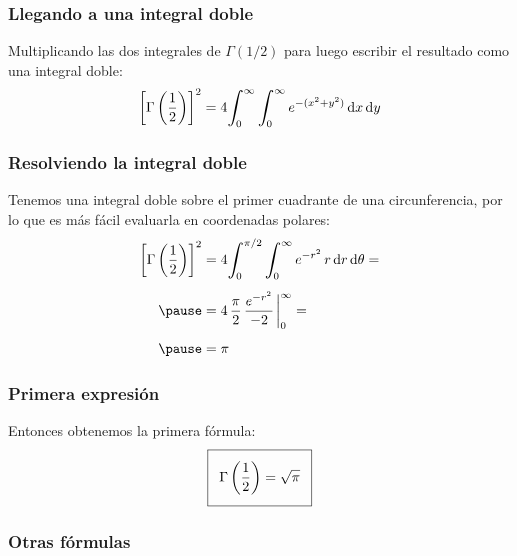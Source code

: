 \documentclass[12pt]{beamer}
\begin{document}
\begin{frame}
\frametitle{Llegando a una integral doble}
Multiplicando las dos integrales de $\Gamma (1/2)$ para luego escribir el resultado como una integral doble:
\pause
\begin{align*}
\left[ \Gamma \left( \dfrac{1}{2} \right) \right]^{2} = 4 \scaleint{6ex}_{\bs 0}^{\infty} \, \scaleint{6ex}_{\bs 0}^{\infty} \, e^{-(x^{2} + y^{2})} \dd{x} \dd{y}
\end{align*}
\end{frame}
\begin{frame}
\frametitle{Resolviendo la integral doble}
Tenemos una integral doble sobre el primer cuadrante de una circunferencia, por lo que es más fácil evaluarla en coordenadas polares:
\pause
\begin{eqnarray*}
\begin{aligned}
\left[ \Gamma \left( \dfrac{1}{2} \right) \right]^{2} &= 4 \scaleint{6ex}_{\bs 0}^{\pi/2} \, \scaleint{6ex}_{\bs 0}^{\infty} \, e^{-r^{2}} \, r \dd{r} \dd{\theta} = \\[0.5em] \pause
&= 4 \, \dfrac{\pi}{2} \, \dfrac{e^{-r^{2}}}{-2}\eval_{0}^{\infty} = \\[0.5em] \pause
&= \pi
\end{aligned}
\end{eqnarray*}
\end{frame}
\begin{frame}
\frametitle{Primera expresión}
Entonces obtenemos la primera fórmula:
\pause
\begin{align}\addtolength{\fboxsep}{5pt}\boxed{
\Gamma \left( \dfrac{1}{2} \right) = \sqrt{\pi}}
\label{eq:ecuacion_05_03}
\end{align}
\end{frame}

\subsubsection*{Otras fórmulas}
\end{document}
